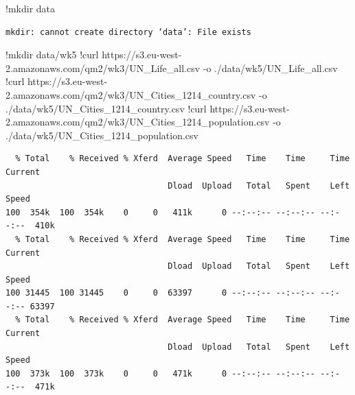 \documentclass[
  letterpaper,
  DIV=11,
  numbers=noendperiod]{scrreprt}
\newenvironment{Shaded}{\begin{snugshade}}{\end{snugshade}}
\newcommand{\ErrorTok}[1]{\textcolor[rgb]{0.68,0.00,0.00}{#1}}
\newcommand{\FloatTok}[1]{\textcolor[rgb]{0.68,0.00,0.00}{#1}}
\newcommand{\NormalTok}[1]{\textcolor[rgb]{0.00,0.23,0.31}{#1}}
\newcommand{\OperatorTok}[1]{\textcolor[rgb]{0.37,0.37,0.37}{#1}}
\begin{document}
\begin{Shaded}
\begin{Highlighting}[]
\OperatorTok{!}\NormalTok{mkdir data}
\end{Highlighting}
\end{Shaded}

\begin{verbatim}
mkdir: cannot create directory ‘data’: File exists
\end{verbatim}

\begin{Shaded}
\begin{Highlighting}[]
\OperatorTok{!}\NormalTok{mkdir data}\OperatorTok{/}\NormalTok{wk5}
\OperatorTok{!}\NormalTok{curl https:}\OperatorTok{//}\NormalTok{s3.eu}\OperatorTok{{-}}\NormalTok{west}\OperatorTok{{-}}\FloatTok{2.}\ErrorTok{amazonaws}\NormalTok{.com}\OperatorTok{/}\NormalTok{qm2}\OperatorTok{/}\NormalTok{wk3}\OperatorTok{/}\NormalTok{UN\_Life\_all.csv }\OperatorTok{{-}}\NormalTok{o .}\OperatorTok{/}\NormalTok{data}\OperatorTok{/}\NormalTok{wk5}\OperatorTok{/}\NormalTok{UN\_Life\_all.csv}
\OperatorTok{!}\NormalTok{curl https:}\OperatorTok{//}\NormalTok{s3.eu}\OperatorTok{{-}}\NormalTok{west}\OperatorTok{{-}}\FloatTok{2.}\ErrorTok{amazonaws}\NormalTok{.com}\OperatorTok{/}\NormalTok{qm2}\OperatorTok{/}\NormalTok{wk3}\OperatorTok{/}\NormalTok{UN\_Cities\_1214\_country.csv }\OperatorTok{{-}}\NormalTok{o .}\OperatorTok{/}\NormalTok{data}\OperatorTok{/}\NormalTok{wk5}\OperatorTok{/}\NormalTok{UN\_Cities\_1214\_country.csv}
\OperatorTok{!}\NormalTok{curl https:}\OperatorTok{//}\NormalTok{s3.eu}\OperatorTok{{-}}\NormalTok{west}\OperatorTok{{-}}\FloatTok{2.}\ErrorTok{amazonaws}\NormalTok{.com}\OperatorTok{/}\NormalTok{qm2}\OperatorTok{/}\NormalTok{wk3}\OperatorTok{/}\NormalTok{UN\_Cities\_1214\_population.csv }\OperatorTok{{-}}\NormalTok{o .}\OperatorTok{/}\NormalTok{data}\OperatorTok{/}\NormalTok{wk5}\OperatorTok{/}\NormalTok{UN\_Cities\_1214\_population.csv}
\end{Highlighting}
\end{Shaded}

\begin{verbatim}
  % Total    % Received % Xferd  Average Speed   Time    Time     Time  Current
                                 Dload  Upload   Total   Spent    Left  Speed
100  354k  100  354k    0     0   411k      0 --:--:-- --:--:-- --:--:--  410k
  % Total    % Received % Xferd  Average Speed   Time    Time     Time  Current
                                 Dload  Upload   Total   Spent    Left  Speed
100 31445  100 31445    0     0  63397      0 --:--:-- --:--:-- --:--:-- 63397
  % Total    % Received % Xferd  Average Speed   Time    Time     Time  Current
                                 Dload  Upload   Total   Spent    Left  Speed
100  373k  100  373k    0     0   471k      0 --:--:-- --:--:-- --:--:--  471k
\end{verbatim}
\end{document}
